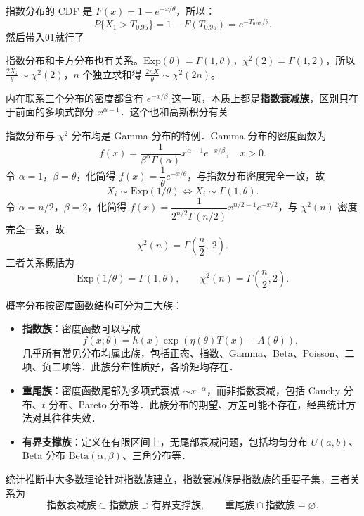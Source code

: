\begin{dxtips}
    指数分布的 CDF 是 $F(x) = 1 - e^{-x/\theta}$，所以：
\[
P\{X_1 > T_{0.95}\} = 1 - F(T_{0.95}) = e^{-T_{0.95}/\theta}.
\]然后带入θ1就行了
\end{dxtips}
\begin{dxtips}
    指数分布和卡方分布也有关系。$\text{Exp}(\theta) = \Gamma(1,\theta)$，$\chi^2(2) = \Gamma(1,2)$，所以 $\frac{2X_i}{\theta} \sim \chi^2(2)$，$n$ 个独立求和得 $\frac{2n\bar{X}}{\theta} \sim \chi^2(2n)$。
\end{dxtips}
\begin{dxtips}
    内在联系三个分布的密度都含有 $e^{-x/\beta}$ 这一项，本质上都是\textbf{指数衰减族}，区别只在于前面的多项式部分 $x^{\alpha-1}$．这个也和高斯积分有关
\end{dxtips}
\begin{note}
指数分布与 $\chi^2$ 分布均是 Gamma 分布的特例．Gamma 分布的密度函数为
\[
f(x) = \frac{1}{\beta^\alpha \Gamma(\alpha)} x^{\alpha-1} e^{-x/\beta}, \quad x > 0.
\]
令 $\alpha = 1$，$\beta = \theta$，化简得 $f(x) = \dfrac{1}{\theta} e^{-x/\theta}$，与指数分布密度完全一致，故
\[
X_i \sim \text{Exp}(1/\theta) \iff X_i \sim \Gamma(1, \theta).
\]
令 $\alpha = n/2$，$\beta = 2$，化简得 $f(x) = \dfrac{1}{2^{n/2}\Gamma(n/2)} x^{n/2-1} e^{-x/2}$，与 $\chi^2(n)$ 密度完全一致，故
\[
\chi^2(n) = \Gamma\!\left(\frac{n}{2},\ 2\right).
\]
三者关系概括为
\[
\text{Exp}(1/\theta) = \Gamma(1, \theta), \qquad \chi^2(n) = \Gamma\!\left(\frac{n}{2}, 2\right).
\]
\end{note}
\begin{note}
概率分布按密度函数结构可分为三大族：
\begin{itemize}
    \item \textbf{指数族}：密度函数可以写成
    \[
    f(x;\theta) = h(x)\exp\!\left(\eta(\theta)T(x) - A(\theta)\right),
    \]
    几乎所有常见分布均属此族，包括正态、指数、Gamma、Beta、Poisson、二项、负二项等．此族分布性质好，各阶矩均存在．

    \item \textbf{重尾族}：密度函数尾部为多项式衰减 $\sim x^{-\alpha}$，而非指数衰减，包括 Cauchy 分布、$t$ 分布、Pareto 分布等．此族分布的期望、方差可能不存在，经典统计方法对其往往失效．

    \item \textbf{有界支撑族}：定义在有限区间上，无尾部衰减问题，包括均匀分布 $U(a,b)$、Beta 分布 $\text{Beta}(\alpha,\beta)$、三角分布等．
\end{itemize}
统计推断中大多数理论针对指数族建立，指数衰减族是指数族的重要子集，三者关系为
\[
\text{指数衰减族} \subset \text{指数族} \supset \text{有界支撑族}, \qquad \text{重尾族} \cap \text{指数族} = \varnothing.
\]
\end{note}
